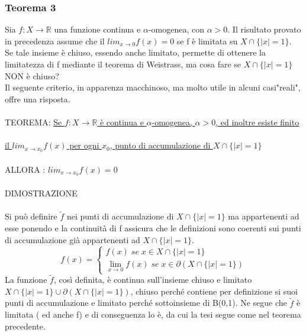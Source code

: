 \documentclass[fontsize = 20px, paper = a4]{article}
\begin{document}
\subsubsection{Teorema 3}
Sia $f: X \to \mathbb{R}$ una funzione continua e $\alpha$-omogenea, con $\alpha > 0$. Il risultato provato in precedenza assume che il $lim_{x \to 0} f(x) = 0$ se f è limitata su $X \cap \{|x| = 1\}$.\\
Se tale insieme è chiuso, essendo anche limitato, permette di ottenere la limitatezza di f mediante il teorema di Weistrass, ma cosa fare se $X \cap \{ |x| = 1\}$ NON è chiuso? \\
Il seguente criterio, in apparenza macchinoso, ma molto utile in alcuni casi"reali", offre una risposta.\\\\
TEOREMA: \underline{Se $f:X \to \mathbb{R}$ è continua e $\alpha$-omogenea, $\alpha > 0$, ed inoltre esiste finito}
\\ \\ \underline{ il $lim_{x \to x_0} f(x)$ per ogni $x_0$, punto di accumulazione di $X \cap \{ |x| = 1\}$}
\\ \\ ALLORA : \underline{$lim_{x \to x_0} f(x) = 0$}
\\ \\ DIMOSTRAZIONE \\ \\
Si può definire $\tilde{f}$ nei punti di accumulazione di $X \cap \{ |x| = 1 \}$ ma appartenenti ad esse ponendo 
e la continuità di f assicura che le definizioni sono coerenti sui punti di accumulazione già appartenenti ad $ X \cap \{ |x| = 1 \}$.\\
\[f(x) = \left\{
  \begin{array}{lr}
    f(x) \; se \; x \in X \cap \{|x| = 1 \} \\
    \lim_{x \to 0 } f(x) \; se \; x \in \partial(X \cap \{|x| = 1 \}) 
  \end{array}
\right.
\]
La funzione $\tilde{f}$, così definita, è continua sull'insieme chiuso e limitato $X \cap \{|x| = 1 \} \cup \partial(X \cap \{|x| = 1 \})$, chiuso perché contiene per definizione si suoi punti di accumulazione e limitato perché sottoinsieme di B(0,1). Ne segue che $\tilde{f}$ è limitata ( ed anche f) e di conseguenza lo è, da cui la tesi segue come nel teorema precedente.\\ \\
\end{document}
